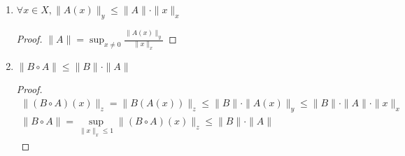 \begin{conseq}
	\begin{enumerate}
	\item
		$\forall x \in X, \|A(x)\| _ y \le \|A\| \cdot \|x\|_x$
		\begin{proof}
			$\|A\| = \sup_{x \ne 0} \frac{\|A(x)\|_y}{\|x\|_x}$
		\end{proof}

	\item
		$\|B \circ A\| \le \|B\| \cdot \|A\|$
		\begin{proof}
			\begin{gather*}
				\|(B \circ A)(x)\|_z = \|B(A(x))\|_z \le \|B\| \cdot \|A(x)\|_y \le \|B\| \cdot \|A\| \cdot \|x\|_x \\
				\|B \circ A\| = \sup_{\|x\|_x \le 1} \|(B\circ A)(x)\|_z \le \|B\| \cdot \|A\|
			\end{gather*}
		\end{proof}
	\end{enumerate}
\end{conseq}

